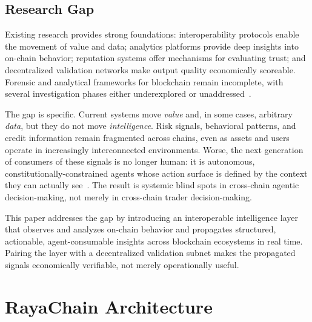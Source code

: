 \documentclass[journal]{IEEEtran}
\begin{document}
\subsection{Research Gap}

Existing research provides strong foundations: interoperability
protocols enable the movement of value and data; analytics platforms
provide deep insights into on-chain behavior; reputation systems offer
mechanisms for evaluating trust; and decentralized validation networks
make output quality economically scoreable. Forensic and analytical
frameworks for blockchain remain incomplete, with several investigation
phases either underexplored or
unaddressed~\cite{MasudHSAAAY21,DudaniBRM23}.

The gap is specific. Current systems move \textit{value} and, in some
cases, arbitrary \textit{data}, but they do not move
\textit{intelligence}. Risk signals, behavioral patterns, and credit
information remain fragmented across chains, even as assets and users
operate in increasingly interconnected environments. Worse, the next
generation of consumers of these signals is no longer human: it is
autonomous, constitutionally-constrained agents whose action surface is
defined by the context they can actually
see~\cite{bai2022constitutional}. The result is systemic blind spots in
cross-chain agentic decision-making, not merely in cross-chain trader
decision-making.

This paper addresses the gap by introducing an interoperable
intelligence layer that observes and analyzes on-chain behavior and
propagates structured, actionable, agent-consumable insights across
blockchain ecosystems in real time. Pairing the layer with a
decentralized validation subnet makes the propagated signals
economically verifiable, not merely operationally useful.

\section{RayaChain Architecture}\label{sec:arch}
\end{document}
